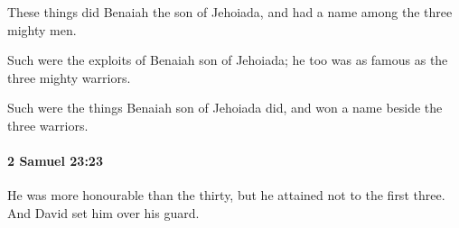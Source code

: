 			\begin{versebox}
					\item[BHS] 
					\item[ASV] These things did Benaiah the son of Jehoiada, and had a name among the three mighty men.
					\item[NIV] Such were the exploits of Benaiah son of Jehoiada; he too was as famous as the three mighty warriors.
					\item[NRSV] Such were the things Benaiah son of Jehoiada did, and won a name beside the three warriors.
			\end{versebox}

		\paragraph{2 Samuel 23:23} %
			\label{2SAMUEL-23-23}

			He was more honourable than the thirty, but he attained not to the first three. And David set him over his guard.

